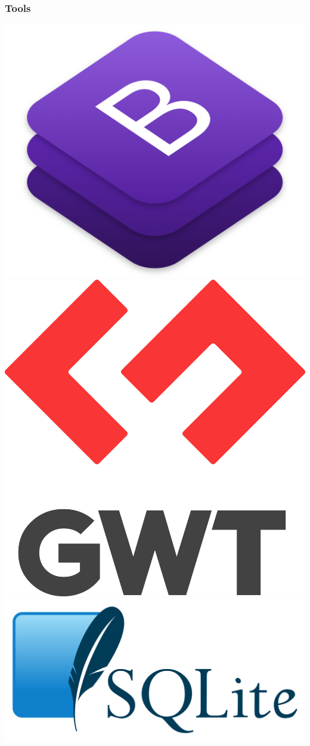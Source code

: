 \documentclass[10pt]{beamer}
\begin{document}
\begin{frame}
\frametitle{Tools}
\includegraphics[trim={0, 0, 0, 0}, clip, scale=0.1]{img/bootstrapLogo.png}
\includegraphics[trim={0, 0, 0, 0}, clip, scale=0.05]{img/gwtLogo.png}
\includegraphics[trim={0, 0, 0, 0}, clip, scale=0.1]{img/SQLite.png}



\end{frame}
\end{document}

